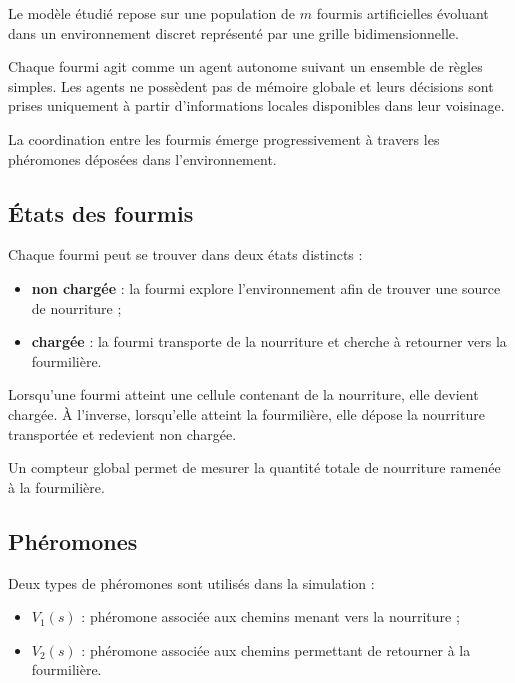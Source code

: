 \documentclass[11pt]{article}
\begin{document}
Le modèle étudié repose sur une population de $m$ fourmis artificielles évoluant dans un environnement discret représenté par une grille bidimensionnelle.

Chaque fourmi agit comme un agent autonome suivant un ensemble de règles simples. Les agents ne possèdent pas de mémoire globale et leurs décisions sont prises uniquement à partir d'informations locales disponibles dans leur voisinage.

La coordination entre les fourmis émerge progressivement à travers les phéromones déposées dans l'environnement.

\subsection{États des fourmis}

Chaque fourmi peut se trouver dans deux états distincts :

\begin{itemize}

\item \textbf{non chargée} : la fourmi explore l'environnement afin de trouver une source de nourriture ;

\item \textbf{chargée} : la fourmi transporte de la nourriture et cherche à retourner vers la fourmilière.

\end{itemize}

Lorsqu'une fourmi atteint une cellule contenant de la nourriture, elle devient chargée. À l'inverse, lorsqu'elle atteint la fourmilière, elle dépose la nourriture transportée et redevient non chargée.

Un compteur global permet de mesurer la quantité totale de nourriture ramenée à la fourmilière.

\subsection{Phéromones}

Deux types de phéromones sont utilisés dans la simulation :

\begin{itemize}

\item $V_1(s)$ : phéromone associée aux chemins menant vers la nourriture ;
\item $V_2(s)$ : phéromone associée aux chemins permettant de retourner à la fourmilière.
\end{itemize}
\end{document}
